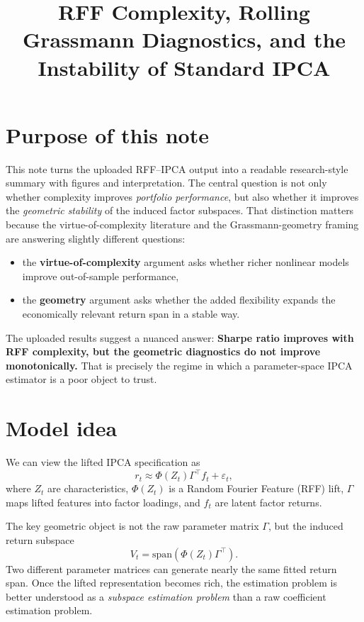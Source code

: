 \documentclass[11pt]{article}
\title{\textbf{RFF Complexity, Rolling Grassmann Diagnostics, and the Instability of Standard IPCA}}
\author{}
\date{}
\begin{document}
\maketitle

\section{Purpose of this note}

This note turns the uploaded RFF--IPCA output into a readable research-style summary with figures and interpretation.
The central question is not only whether complexity improves \emph{portfolio performance}, but also whether it improves the
\emph{geometric stability} of the induced factor subspaces. That distinction matters because the virtue-of-complexity literature
and the Grassmann-geometry framing are answering slightly different questions:

\begin{itemize}
    \item the \textbf{virtue-of-complexity} argument asks whether richer nonlinear models improve out-of-sample performance,
    \item the \textbf{geometry} argument asks whether the added flexibility expands the economically relevant return span in a stable way.
\end{itemize}

The uploaded results suggest a nuanced answer: \textbf{Sharpe ratio improves with RFF complexity, but the geometric diagnostics do not improve monotonically.}
That is precisely the regime in which a parameter-space IPCA estimator is a poor object to trust.

\section{Model idea}

We can view the lifted IPCA specification as
\begin{equation}
r_t \approx \Phi(Z_t)\Gamma^\top f_t + \varepsilon_t,
\end{equation}
where $Z_t$ are characteristics, $\Phi(Z_t)$ is a Random Fourier Feature (RFF) lift, $\Gamma$ maps lifted features into factor loadings,
and $f_t$ are latent factor returns.

The key geometric object is not the raw parameter matrix $\Gamma$, but the induced return subspace
\begin{equation}
V_t = \mathrm{span}\!\left(\Phi(Z_t)\Gamma^\top\right).
\end{equation}
Two different parameter matrices can generate nearly the same fitted return span. Once the lifted representation becomes rich,
the estimation problem is better understood as a \emph{subspace estimation problem} than a raw coefficient estimation problem.
\end{document}
